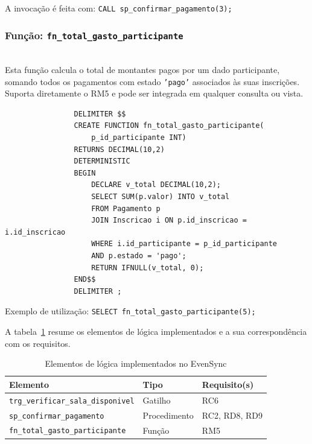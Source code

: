 \documentclass[runningheads]{llncs}
\begin{document}
                A invocação é feita com: \texttt{CALL sp\_confirmar\_pagamento(3);}

                \subsubsection{Função: \texttt{fn\_total\_gasto\_participante}}\mbox{}\\

                Esta função calcula o total de montantes pagos por um dado participante, somando todos os pagamentos com estado \texttt{'pago'} associados às suas inscrições. Suporta diretamente o RM5 e pode ser integrada em qualquer consulta ou vista.

                \begin{verbatim}
                DELIMITER $$
                CREATE FUNCTION fn_total_gasto_participante(
                    p_id_participante INT)
                RETURNS DECIMAL(10,2)
                DETERMINISTIC
                BEGIN
                    DECLARE v_total DECIMAL(10,2);
                    SELECT SUM(p.valor) INTO v_total
                    FROM Pagamento p
                    JOIN Inscricao i ON p.id_inscricao = i.id_inscricao
                    WHERE i.id_participante = p_id_participante
                    AND p.estado = 'pago';
                    RETURN IFNULL(v_total, 0);
                END$$
                DELIMITER ;
                \end{verbatim}

                Exemplo de utilização: \texttt{SELECT fn\_total\_gasto\_participante(5);}

                A tabela~\ref{tab:logica_bd} resume os elementos de lógica implementados e a sua correspondência com os requisitos.

                \begin{table}[H]
                \centering
                \begin{tabular}{|l|l|l|}
                \hline
                \textbf{Elemento} & \textbf{Tipo} & \textbf{Requisito(s)} \\ \hline
                \texttt{trg\_verificar\_sala\_disponivel} & Gatilho     & RC6 \\ \hline
                \texttt{sp\_confirmar\_pagamento}         & Procedimento & RC2, RD8, RD9 \\ \hline
                \texttt{fn\_total\_gasto\_participante}   & Função       & RM5 \\ \hline
                \end{tabular}
                \vspace{0.2cm}
                \caption{Elementos de lógica implementados no EvenSync} \label{tab:logica_bd}
                \end{table}
        
\end{document}
